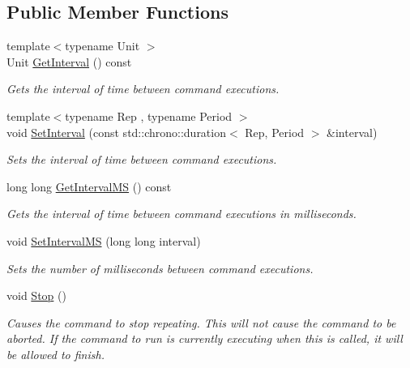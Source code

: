 \subsection*{Public Member Functions}
\begin{DoxyCompactItemize}
\item 
{\footnotesize template$<$typename Unit $>$ }\\Unit \mbox{\hyperlink{class_command_lib_1_1_periodic_command_a4be16b8f26b54d9ca41f01f723eb7faf}{Get\+Interval}} () const
\begin{DoxyCompactList}\small\item\em Gets the interval of time between command executions. \end{DoxyCompactList}\item 
{\footnotesize template$<$typename Rep , typename Period $>$ }\\void \mbox{\hyperlink{class_command_lib_1_1_periodic_command_af344626ecaa9e0ecb85fd2f98100eba9}{Set\+Interval}} (const std\+::chrono\+::duration$<$ Rep, Period $>$ \&interval)
\begin{DoxyCompactList}\small\item\em Sets the interval of time between command executions. \end{DoxyCompactList}\item 
long long \mbox{\hyperlink{class_command_lib_1_1_periodic_command_abef034455e746be6367651cc05702344}{Get\+Interval\+MS}} () const
\begin{DoxyCompactList}\small\item\em Gets the interval of time between command executions in milliseconds. \end{DoxyCompactList}\item 
void \mbox{\hyperlink{class_command_lib_1_1_periodic_command_ae4f9588a25154969bfb9dbf10cf5e367}{Set\+Interval\+MS}} (long long interval)
\begin{DoxyCompactList}\small\item\em Sets the number of milliseconds between command executions. \end{DoxyCompactList}\item 
void \mbox{\hyperlink{class_command_lib_1_1_periodic_command_a59a83d1c32419d61d326040d7aa040ef}{Stop}} ()
\begin{DoxyCompactList}\small\item\em Causes the command to stop repeating. This will not cause the command to be aborted. If the command to run is currently executing when this is called, it will be allowed to finish. \end{DoxyCompactList}\item 

\end{DoxyCompactItemize}
